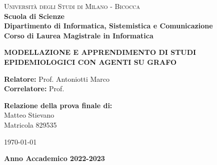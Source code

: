 \begin{titlepage}

    \noindent
    \begin{minipage}[t]{0.19\textwidth}
    \end{minipage}
    \begin{minipage}[t]{0.81\textwidth}
    {
            {\textsc{Università degli Studi di Milano - Bicocca}} \\
            \textbf{Scuola di Scienze} \\
            \textbf{Dipartimento di Informatica, Sistemistica e Comunicazione} \\
            \textbf{Corso di Laurea Magistrale in Informatica} \\
            \par
    }
    \end{minipage}

\vspace{20mm}

\begin{center}
        {\LARGE{
                \textbf{MODELLAZIONE E APPRENDIMENTO DI STUDI EPIDEMIOLOGICI CON AGENTI SU GRAFO}
                \par
        }}
    \end{center}

    \vspace{60mm}

    \noindent
    {\large \textbf{Relatore:} Prof. Antoniotti Marco} \\

    \noindent
    {\large \textbf{Correlatore:} Prof. }

    \vspace{10mm}

    \begin{flushright}
        {\large \textbf{Relazione della prova finale di:}} \\
        \large{Matteo Stievano} \\
        \large{Matricola 829535}
    \end{flushright}

    \vspace{10mm}
    \today
    \begin{center}
        {\large{\bf Anno Accademico 2022-2023}}
    \end{center}

    \restoregeometry

\end{titlepage}